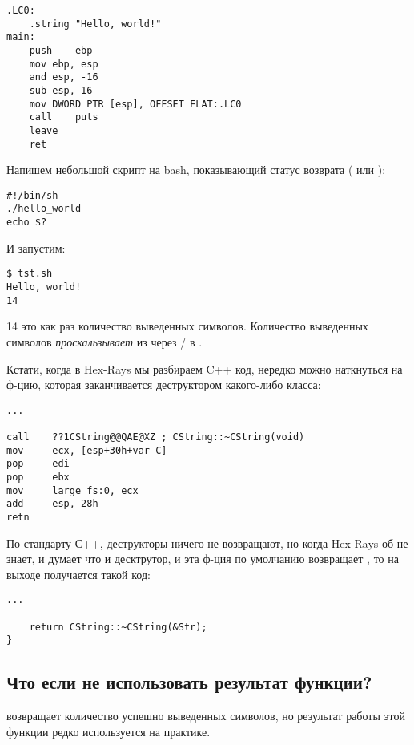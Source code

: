 \begin{lstlisting}[caption=GCC 4.8.1,style=customasmx86]
.LC0:
	.string	"Hello, world!"
main:
	push	ebp
	mov	ebp, esp
	and	esp, -16
	sub	esp, 16
	mov	DWORD PTR [esp], OFFSET FLAT:.LC0
	call	puts
	leave
	ret
\end{lstlisting}

Напишем небольшой скрипт на bash, показывающий статус возврата ( или ):

\begin{lstlisting}[caption=tst.sh]
#!/bin/sh
./hello_world
echo $?
\end{lstlisting}

И запустим:

\begin{lstlisting}
$ tst.sh 
Hello, world!
14
\end{lstlisting}

14 это как раз количество выведенных символов.
Количество выведенных символов \textit{проскальзывает} из \printf{} через / в .


Кстати, когда в Hex-Rays мы разбираем C++ код, нередко можно наткнуться на ф-цию, которая заканчивается
деструктором какого-либо класса:

\begin{lstlisting}
...

call    ??1CString@@QAE@XZ ; CString::~CString(void)
mov     ecx, [esp+30h+var_C]
pop     edi
pop     ebx
mov     large fs:0, ecx
add     esp, 28h
retn
\end{lstlisting}

По стандарту С++, деструкторы ничего не возвращают, но когда Hex-Rays об не знает, и думает что и десктрутор,
и эта ф-ция по умолчанию возвращает \Tint, то на выходе получается такой код:

\begin{lstlisting}[style=customc]
...

	return CString::~CString(&Str);
}
\end{lstlisting}

\subsection{Что если не использовать результат функции?}

\printf возвращает количество успешно выведенных символов, но результат работы этой функции 
редко используется на практике.

